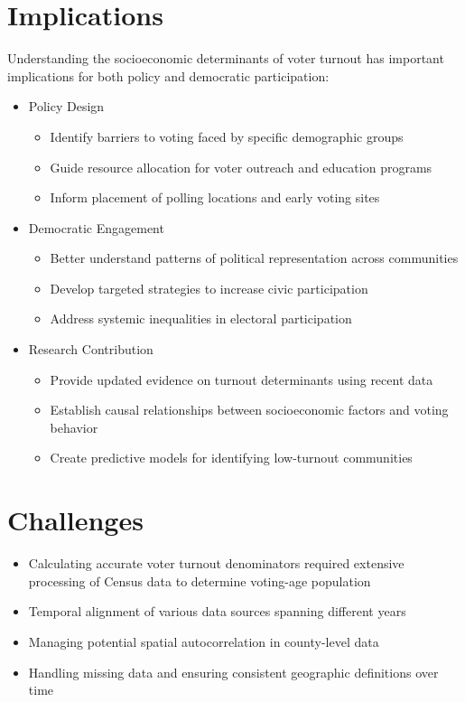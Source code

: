 \documentclass[11pt]{article}
\begin{document}
\section*{Implications}
Understanding the socioeconomic determinants of voter turnout has important implications for both policy and democratic participation:
\begin{itemize}\setlength{\itemsep}{0pt}
    \item Policy Design
          \begin{itemize}\setlength{\itemsep}{0pt}
              \item Identify barriers to voting faced by specific demographic groups
              \item Guide resource allocation for voter outreach and education programs
              \item Inform placement of polling locations and early voting sites
          \end{itemize}
    \item Democratic Engagement
          \begin{itemize}\setlength{\itemsep}{0pt}
              \item Better understand patterns of political representation across communities
              \item Develop targeted strategies to increase civic participation
              \item Address systemic inequalities in electoral participation
          \end{itemize}
    \item Research Contribution
          \begin{itemize}\setlength{\itemsep}{0pt}
              \item Provide updated evidence on turnout determinants using recent data
              \item Establish causal relationships between socioeconomic factors and voting behavior
              \item Create predictive models for identifying low-turnout communities
          \end{itemize}
\end{itemize}

\section*{Challenges}
\begin{itemize}\setlength{\itemsep}{0pt}
    \item Calculating accurate voter turnout denominators required extensive processing of Census data to determine voting-age population
    \item Temporal alignment of various data sources spanning different years
    \item Managing potential spatial autocorrelation in county-level data
    \item Handling missing data and ensuring consistent geographic definitions over time
\end{itemize}
\end{document}
